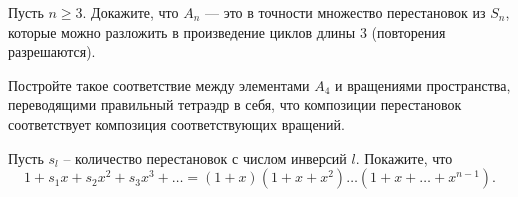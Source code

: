 \documentclass[a4paper,12pt]{article}
\begin{document}
 Пусть $n\geq3$. Докажите, что $A_n$ --- это в точности множество перестановок из $S_n$, которые можно разложить в произведение циклов длины $3$ (повторения разрешаются).

Постройте такое соответствие между элементами $A_4$ и вращениями пространства, переводящими правильный тетраэдр в себя, что композиции перестановок  соответствует композиция соответствующих вращений.






%

%
%
%



Пусть $s_l$ -- количество перестановок с числом инверсий $l$. Покажите, что
$$1+s_1x+s_2x^2+s_3x^3+\ldots=(1+x)(1+x+x^2)\ldots(1+x+\ldots+x^{n-1}).$$



\end{document}
